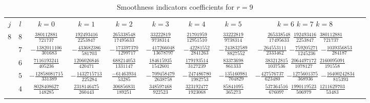 \begin{table}
  \begin{center}
    \caption{Smoothness indicators coefficients for $r=9$}
    \label{tab:IS_9}
    \begin{tabular}{cccccccccc}
      \toprule
      $j$  &  $l$  &  $k=0$                            &  $k=1$                            &  $k=2$                            &  $k=3$                           &  $k=4$                           &  $k=5$                           &  $k=6$                            $k=7$                            $k=8$                            \\ \addlinespace
      $8$  &  $8$  &  $ \frac{   380112881}{ 721737}$  &  $ \frac{   192493416}{2253847}$  &  $ \frac{  265338548}{17495633}$  &  $ \frac{  33222819}{ 9738314}$  &  $ \frac{  21701959}{12951510}$  &  $ \frac{  33222819}{ 9738314}$  &  $ \frac{  265338548}{17495633}$  $ \frac{   192493416}{2253847}$  $ \frac{   380112881}{ 721737}$  \\ \addlinespace
           &  $7$  &  $-\frac{  1382011106}{ 301683}$  &  $-\frac{   433682386}{ 581703}$  &  $-\frac{  173397370}{ 1299717}$  &  $-\frac{ 417266048}{13678797}$  &  $-\frac{  42281552}{ 2841263}$  &  $-\frac{ 243832589}{ 8827552}$  &  $-\frac{  264553111}{ 2333462}$  $-\frac{   759205271}{1245236}$  $-\frac{  1039356853}{ 284187}$  \\ \addlinespace
           &  $6$  &  $ \frac{  7116193241}{ 405236}$  &  $ \frac{  1206026846}{ 420471}$  &  $ \frac{  688214053}{ 1331147}$  &  $ \frac{ 184615935}{ 1542601}$  &  $ \frac{ 179193514}{ 3127239}$  &  $ \frac{  83373698}{  861333}$  &  $ \frac{  383212815}{ 1037536}$  $ \frac{  2064497172}{1078127}$  $ \frac{  2160095091}{ 191558}$  \\ \addlinespace
           &  $5$  &  $-\frac{ 12858081715}{ 331389}$  &  $-\frac{  1432715713}{ 225284}$  &  $ \frac{  -61463934}{   53285}$  &  $-\frac{ 709458479}{ 2638758}$  &  $-\frac{ 247486780}{ 1982753}$  &  $-\frac{ 135160981}{  704829}$  &  $-\frac{  427576737}{  623480}$  $-\frac{  1275601375}{ 368936}$  $-\frac{ 16400242834}{ 815393}$  \\ \addlinespace
           &  $4$  &  $ \frac{  8028408627}{ 148285}$  &  $ \frac{  2318146475}{ 260443}$  &  $ \frac{  306856831}{  189251}$  &  $ \frac{ 348597468}{  922523}$  &  $ \frac{ 323192477}{ 1923068}$  &  $ \frac{  85841095}{  365273}$  &  $ \frac{  537364516}{  676097}$  $ \frac{  1990119523}{ 506979}$  $ \frac{  1211629703}{  53483}$  \\ \addlinespace

\end{tabular}
\end{center}
\end{table}
